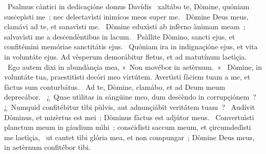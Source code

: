 {~Psalmus càntici in dedicaçióne domus Davídis}
{%
~xaltábo te, Dòmine, quóniam susċepìsti me~; nec delectavìsti inimícos meos super me.
~Dòmine Deus meus, clamávi ad te, et sanavìsti me.
~Dòmine eduxìsti ab infèrno ànimam meam~; salvavìsti me a desċendèntibus in lacum.
~Psàllite Dòmino, sancti ejus, et confitémini memóriae sanctitátis ejus.
~Quóniam ira in indignaçióne ejus, et vita in voluntáte ejus. Ad vèsperum demorábitur fletus, et ad matutínum laetìçia.
~Ego autem dixi in abundànçia mea, «~Non movébor in aetèrnum.~»
~Dòmine, in voluntáte tua, praestitìsti decóri meo virtútem. Avertìsti fàċiem tuam a me, et fàctus sum conturbátus.
~Ad te, Dòmine, clamábo, et ad Deum meum deprecábor.
~¿~Quae utìlitas in sángüine meo, dum desċèndo in corrupçiónem~? ¿~Numquid confitébitur tìbi pùlvis, aut adnunçiábit veritátem tuam~?
~Audívit Dòminus, et mizèrtus est mei~; Dòminus fàctus est adjútor meus.
~Convertuìsti planctum meum in gáudium mìhi~; consċidìsti saccum meum, et çircumdedìsti me laetìçia,
~ut cantet tìbi glória mea, et non compungar~; Dòmine Deus meus, in aetèrnum confitébor tìbi.}
